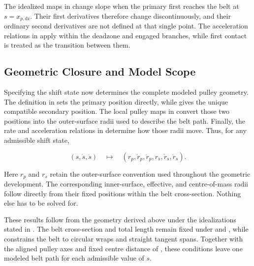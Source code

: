 \documentclass[11pt]{report}
\numberwithin{equation}{section}
\newcounter{assump}
\begin{document}
\begin{remarkbox}
The idealized maps in
 change slope
when the primary first reaches the belt at \(s=x_{p,\mathrm{dz}}\). Their
first derivatives therefore change discontinuously, and their ordinary second
derivatives are not defined at that single point. The acceleration relations
in 
apply within the deadzone and engaged branches, while first contact is treated
as the transition between them.

\end{remarkbox}

\subsection{Geometric Closure and Model Scope}
\label{sec:geometry_conclusion}

Specifying the shift state now determines the complete modeled pulley
geometry. The definition in  sets the primary
position directly, while  gives the unique
compatible secondary position. The local pulley maps in
 convert those two
positions into the outer-surface radii used to describe the belt path.
Finally, the rate and acceleration relations in
 determine how
those radii move. Thus, for any admissible shift state,

\[
    \left(s,\dot s,\ddot s\right)
    \quad\longmapsto\quad
    \left(
        r_p,\dot r_p,\ddot r_p,
        r_s,\dot r_s,\ddot r_s
    \right).
\]

Here \(r_p\) and \(r_s\) retain the outer-surface convention used throughout
the geometric development. The corresponding inner-surface, effective, and
centre-of-mass radii follow directly from their fixed positions within the
belt cross-section. Nothing else has to be solved for.

These results follow from the geometry derived above under the idealizations
stated in . The belt cross-section and total length remain
fixed under  and
, while
 constrains the belt to circular wraps and
straight tangent spans. Together with the aligned pulley axes and fixed centre
distance of , these conditions leave one modeled
belt path for each admissible value of \(s\).
\end{document}
